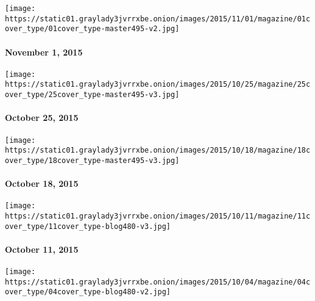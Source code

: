 \href{http://www.nytimes3xbfgragh.onion/indexes/2015/11/01/magazine/index.html}{}

\texttt{[image: https://static01.graylady3jvrrxbe.onion/images/2015/11/01/magazine/01cover\_type/01cover\_type-master495-v2.jpg]}

\hypertarget{november-1-2015}{%
\paragraph{November 1, 2015}\label{november-1-2015}}

\href{http://www.nytimes3xbfgragh.onion/indexes/2015/10/25/magazine/index.html}{}

\texttt{[image: https://static01.graylady3jvrrxbe.onion/images/2015/10/25/magazine/25cover\_type/25cover\_type-master495-v3.jpg]}

\hypertarget{october-25-2015}{%
\paragraph{October 25, 2015}\label{october-25-2015}}

\href{http://www.nytimes3xbfgragh.onion/indexes/2015/10/18/magazine/index.html}{}

\texttt{[image: https://static01.graylady3jvrrxbe.onion/images/2015/10/18/magazine/18cover\_type/18cover\_type-master495-v3.jpg]}

\hypertarget{october-18-2015}{%
\paragraph{October 18, 2015}\label{october-18-2015}}

\href{http://www.nytimes3xbfgragh.onion/indexes/2015/10/11/magazine/index.html}{}

\texttt{[image: https://static01.graylady3jvrrxbe.onion/images/2015/10/11/magazine/11cover\_type/11cover\_type-blog480-v3.jpg]}

\hypertarget{october-11-2015}{%
\paragraph{October 11, 2015}\label{october-11-2015}}

\href{http://www.nytimes3xbfgragh.onion/indexes/2015/10/04/magazine/index.html}{}

\texttt{[image: https://static01.graylady3jvrrxbe.onion/images/2015/10/04/magazine/04cover\_type/04cover\_type-blog480-v2.jpg]}

